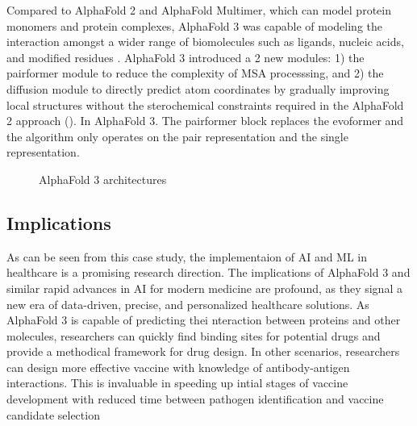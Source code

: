 \documentclass{article}
\begin{document}
Compared to AlphaFold 2 and AlphaFold Multimer, which can model protein monomers and protein complexes, AlphaFold 3 was capable of modeling the interaction amongst a wider range of biomolecules such as ligands, nucleic acids, and modified residues \cite{abramson_accurate_2024}. AlphaFold 3 introduced a  2 new modules: 1) the pairformer module to reduce the complexity of MSA processsing, and 2) the diffusion module to directly predict atom coordinates by gradually improving local structures without the sterochemical constraints required in the AlphaFold 2 approach (). In AlphaFold 3. 
The pairformer block replaces the evoformer and the algorithm only operates on the pair representation and the single representation.

\begin{figure}[h]
    \caption{AlphaFold 3 architectures} 
    \label{fig:AlphaFold3_Architecture}
\end{figure}

\subsection{Implications}
As can be seen from this case study, the implementaion of AI and ML in healthcare is a promising research direction. The implications of AlphaFold 3 and similar rapid advances in AI for modern medicine are profound, as they signal a new era of data-driven, precise, and personalized healthcare solutions. As AlphaFold 3 is capable of predicting thei nteraction between proteins and other molecules, researchers can quickly find binding sites for potential drugs and provide a methodical framework for drug design. In other scenarios, researchers can design more effective vaccine with knowledge of antibody-antigen interactions. This is invaluable in speeding up intial stages of vaccine development with reduced time between pathogen identification and vaccine candidate selection  







\end{document}
